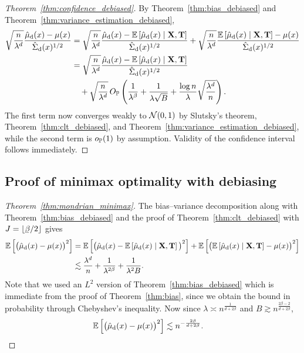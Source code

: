 \begin{proof}[Theorem~\ref{thm:confidence_debiased}]
  By Theorem~\ref{thm:bias_debiased}
  and Theorem~\ref{thm:variance_estimation_debiased},
  \begin{align*}
    \sqrt{\frac{n}{\lambda^d}}
    \frac{\hat \mu_\rd(x) - \mu(x)}{\hat \Sigma_\rd(x)^{1/2}}
    &=
    \sqrt{\frac{n}{\lambda^d}}
    \frac{\hat \mu_\rd(x) - \E \left[ \hat \mu_\rd(x) \mid \bX, \bT \right]}
    {\hat \Sigma_\rd(x)^{1/2}}
    + \sqrt{\frac{n}{\lambda^d}}
    \frac{\E \left[ \hat \mu_\rd(x) \mid \bX, \bT \right] - \mu(x)}
    {\hat \Sigma_\rd(x)^{1/2}} \\
    &=
    \sqrt{\frac{n}{\lambda^d}}
    \frac{\hat \mu_\rd(x) - \E \left[ \hat \mu_\rd(x) \mid \bX, \bT \right]}
    {\hat \Sigma_\rd(x)^{1/2}} \\
    &\quad+
    \sqrt{\frac{n}{\lambda^d}} \,
    O_\P \left(
      \frac{1}{\lambda^\beta}
      + \frac{1}{\lambda \sqrt B}
      + \frac{\log n}{\lambda} \sqrt{\frac{\lambda^d}{n}}
    \right).
  \end{align*}
  The first term now converges weakly to $\cN(0,1)$ by
  Slutsky's theorem, Theorem~\ref{thm:clt_debiased},
  and Theorem~\ref{thm:variance_estimation_debiased},
  while the second term is $o_\P(1)$ by assumption.
  Validity of the confidence interval follows immediately.
\end{proof}

\subsection*{Proof of minimax optimality with debiasing}

\begin{proof}[Theorem~\ref{thm:mondrian_minimax}]

  The bias--variance decomposition along with
  Theorem~\ref{thm:bias_debiased}
  and the proof of Theorem~\ref{thm:clt_debiased}
  with $J = \lfloor \flbeta / 2 \rfloor$ gives
  \begin{align*}
    \E \left[
      \big(
        \hat \mu_\rd(x)
        - \mu(x)
      \big)^2
    \right]
    &=
    \E \left[
      \big(
        \hat \mu_\rd(x)
        - \E \left[ \hat \mu_\rd(x) \mid \bX, \bT \right]
      \big)^2
    \right]
    + \E \left[
      \big(
        \E \left[ \hat \mu_\rd(x) \mid \bX, \bT \right]
        - \mu(x)
      \big)^2
    \right] \\
    &\lesssim
    \frac{\lambda^d}{n}
    + \frac{1}{\lambda^{2\beta}}
    + \frac{1}{\lambda^2 B}.
  \end{align*}
  Note that we used an $L^2$ version of Theorem~\ref{thm:bias_debiased}
  which is immediate from the proof of Theorem~\ref{thm:bias},
  since we obtain the bound in probability through
  Chebyshev's inequality.
  Now since
  $\lambda \asymp n^{\frac{1}{d + 2 \beta}}$
  and
  $B \gtrsim n^{\frac{2 \beta - 2}{d + 2 \beta}}$,
  \begin{align*}
    \E \left[
      \big(
        \hat \mu_\rd(x)
        - \mu(x)
      \big)^2
    \right]
    &\lesssim
    n^{-\frac{2\beta}{d + 2 \beta}}.
  \end{align*}
\end{proof}
